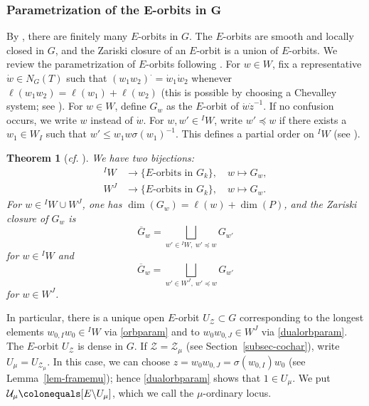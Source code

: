 \documentclass[10pt,a4paper]{article}
\numberwithin{equation}{section}
\newtheorem{theorem}{Theorem}[section]
\theoremstyle{definition}
\theoremstyle{remark}
\newcommand{\Ucal}{{\mathcal U}}
\newcommand{\Zcal}{{\mathcal Z}}
\begin{document}
\subsubsection{Parametrization of the \texorpdfstring{$\boldsymbol{E}$}{E}-orbits in \texorpdfstring{$\boldsymbol{G}$}{G}}
\label{subsec-zipstrata}
By \cite[Proposition 7.1]{Pink-Wedhorn-Ziegler-zip-data}, there are finitely many $E$-orbits in $G$. The $E$-orbits are smooth and locally closed in $G$, and the Zariski closure of an $E$-orbit is a union of $E$-orbits. We review the parametrization of $E$-orbits following \cite{Pink-Wedhorn-Ziegler-zip-data}. For $w\in W$, fix a representative $\dot{w}\in N_G(T)$ such that $(w_1w_2)^\cdot = \dot{w}_1\dot{w}_2$ whenever $\ell(w_1 w_2)=\ell(w_1)+\ell(w_2)$ (this is possible by choosing a Chevalley system; see \cite[Section~XXIII.6]{SGA3}). For $w\in W$, define $G_w$ as the $E$-orbit of $\dot{w}\dot{z}^{-1}$. If no confusion occurs, we write $w$ instead of $\dot{w}$. For $w,w'\in {}^I W$, write $w'\preccurlyeq w$ if there exists a $w_1\in W_I$ such that $w'\leq w_1 w \sigma(w_1)^{-1}$. This defines a partial order on ${}^I W$ (see \cite[Corollary 6.3]{Pink-Wedhorn-Ziegler-zip-data}).

\begin{theorem}[\textit{cf.} {\cite[Theorems 7.5,~11.2,~11.3 and~11.5]{Pink-Wedhorn-Ziegler-zip-data}}] \label{thm-E-orb-param}
We have two bijections:
\begin{align} \label{orbparam}
{}^I W &\longrightarrow \{ \textrm{$E$-orbits in $G_k$} \}, \quad w\longmapsto G_w,  \\  
\label{dualorbparam} W^J &\longrightarrow \{ \textrm{$E$-orbits in $G_k$}\}, \quad  w\longmapsto G_w. 
\end{align}
For $w\in {}^I W\cup W^J$, one has $\dim(G_w)= \ell(w)+\dim(P)$, and the Zariski closure of $G_w$ is 
\begin{equation}\label{equ-closure-rel}
\overline{G}_w=\bigsqcup_{w'\in {}^IW,\  w'\preccurlyeq w} G_{w'}
\end{equation}
for $w\in {}^I W$ and 
\begin{equation}\label{equ-closure-relJ}
\overline{G}_w=\bigsqcup_{w'\in W^J,\  w'\preccurlyeq w} G_{w'}
\end{equation}
for $w\in W^J$.
\end{theorem}
In particular, there is a unique open $E$-orbit $U_\Zcal\subset G$ corresponding to the longest elements $w_{0,I}w_0\in {}^I W$ via \eqref{orbparam} and to $w_0w_{0,J}\in W^J$ via \eqref{dualorbparam}. The $E$-orbit $U_\Zcal$ is dense in $G$.  If $\Zcal=\Zcal_\mu$ (see Section~\ref{subsec-cochar}), write $U_\mu=U_{\Zcal_\mu}$. In this case, we can choose $z=w_{0}w_{0,J}=\sigma(w_{0,I})w_0$ (see Lemma~\ref{lem-framemu}); hence \eqref{dualorbparam} shows that $1\in U_\mu$.  We put $\Ucal_\mu \colonequals [E\backslash U_\mu]$, which we call the $\mu$-ordinary locus.
\end{document}
